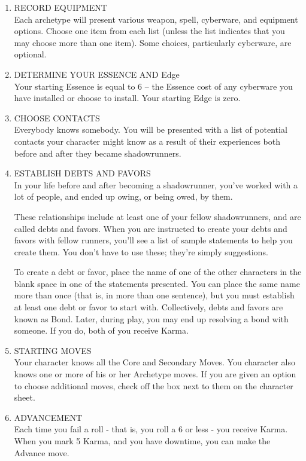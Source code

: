 \begin{enumerate}
\item RECORD EQUIPMENT \\
Each archetype will present various weapon, spell, cyberware, and equipment options. Choose one item from each list (unless the list indicates that you may choose more than one item). Some choices, particularly cyberware, are optional.

\item DETERMINE YOUR ESSENCE AND Edge \\
Your starting Essence is equal to 6 – the Essence cost of any cyberware you have installed or choose to install. Your starting Edge is zero.

\item CHOOSE CONTACTS \\
Everybody knows somebody. You will be presented with a list of potential contacts your character might know as a result of their experiences both before and after they became shadowrunners.

\item ESTABLISH DEBTS AND FAVORS \\
In your life before and after becoming a shadowrunner, you’ve worked with a lot of people, and ended up owing, or being owed, by them.

These relationships include at least one of your fellow shadowrunners, and are called debts and favors. When you are instructed to create your debts and favors with fellow runners, you’ll see a list of sample statements to help you create them. You don’t have to use these; they’re simply suggestions.

To create a debt or favor, place the name of one of the other characters in the blank space in one of the statements presented. You can place the same name more than once (that is, in more than one sentence), but you must establish at least one debt or favor to start with. Collectively, debts and favors are known as Bond. Later, during play, you may end up resolving a bond with someone. If you do, both of you receive Karma.

\item STARTING MOVES \\
Your character knows all the Core and Secondary Moves. You character also knows one or more of his or her Archetype moves. If you are given an option to choose additional moves, check off the box next to them on the character sheet.

\item ADVANCEMENT \\
Each time you fail a roll - that is, you roll a 6 or less - you receive Karma. When you mark 5 Karma, and you have downtime, you can make the Advance move.
\end{enumerate}



